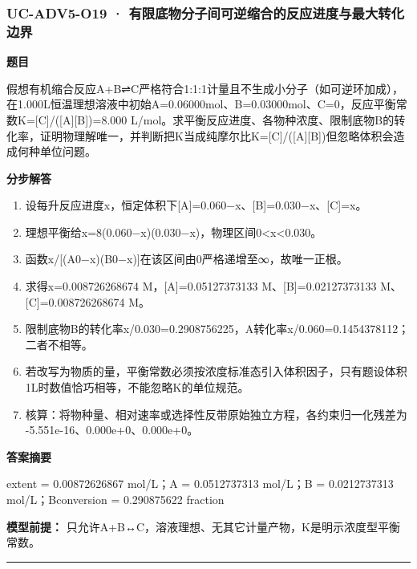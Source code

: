 \documentclass[UTF8,11pt,a4paper]{ctexart}
\begin{document}
\subsubsection*{UC-ADV5-O19 · 有限底物分子间可逆缩合的反应进度与最大转化边界}
\noindent\textbf{题目}\par
假想有机缩合反应A+B⇌C严格符合1:1:1计量且不生成小分子（如可逆环加成），在1.000L恒温理想溶液中初始A=0.06000mol、B=0.03000mol、C=0，反应平衡常数K=[C]/([A][B])=8.000 L/mol。求平衡反应进度、各物种浓度、限制底物B的转化率，证明物理解唯一，并判断把K当成纯摩尔比K=[C]/([A][B])但忽略体积会造成何种单位问题。\par
\medskip\noindent\textbf{分步解答}
\begin{enumerate}
\item 设每升反应进度x，恒定体积下[A]=0.060−x、[B]=0.030−x、[C]=x。
\item 理想平衡给x=8(0.060−x)(0.030−x)，物理区间0<x<0.030。
\item 函数x/[(A0−x)(B0−x)]在该区间由0严格递增至∞，故唯一正根。
\item 求得x=0.008726268674 M，[A]=0.05127373133 M、[B]=0.02127373133 M、[C]=0.008726268674 M。
\item 限制底物B的转化率x/0.030=0.2908756225，A转化率x/0.060=0.1454378112；二者不相等。
\item 若改写为物质的量，平衡常数必须按浓度标准态引入体积因子，只有题设体积1L时数值恰巧相等，不能忽略K的单位规范。
\item 核算：将物种量、相对速率或选择性反带原始独立方程，各约束归一化残差为 -5.551e-16、0.000e+0、0.000e+0。
\end{enumerate}
\noindent\textbf{答案摘要}\par
extent = 0.00872626867 mol/L；A = 0.0512737313 mol/L；B = 0.0212737313 mol/L；Bconversion = 0.290875622 fraction\par
\noindent\textbf{模型前提：}
只允许A+B↔C，溶液理想、无其它计量产物，K是明示浓度型平衡常数。\par
\medskip\hrule\medskip
{}
\end{document}
